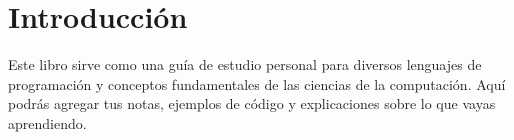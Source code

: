 \chapter{Introducción}
Este libro sirve como una guía de estudio personal para diversos lenguajes de programación y conceptos fundamentales de las ciencias de la computación.
Aquí podrás agregar tus notas, ejemplos de código y explicaciones sobre lo que vayas aprendiendo.

